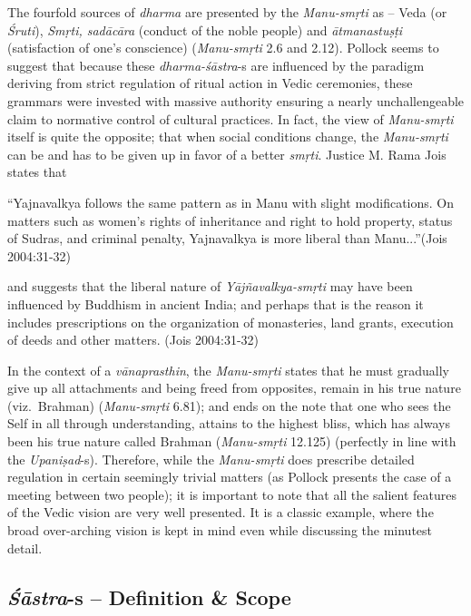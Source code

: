 The fourfold sources of {\sl dharma} are presented by the {\sl Manu-smṛti} as -- Veda (or {\sl Śruti}), {\sl Smṛti, sadācāra} (conduct of the noble people) and {\sl ātmanastuṣṭi} (satisfaction of one's conscience) ({\sl Manu-smṛti} 2.6 and 2.12). Pollock seems to suggest that because these {\sl dharma-śāstra}-s are influenced by the paradigm deriving from strict regulation of ritual action in Vedic ceremonies, these grammars were invested with massive authority ensuring a nearly unchallengeable claim to normative control of cultural practices. In fact, the view of {\sl Manu-smṛti} itself is quite the opposite; that when social conditions change, the {\sl Manu-smṛti} can be and has to be given up in favor of a better {\sl smṛti}. Justice M. Rama Jois states that
\begin{myquote}
``Yajnavalkya follows the same pattern as in Manu with slight modifications. On matters such as women's rights of inheritance and right to hold property, status of Sudras, and criminal penalty, Yajnavalkya is more liberal than Manu...''\hfill (Jois 2004:31-32)
\end{myquote}
and suggests that the liberal nature of {\sl Yājñavalkya-smṛti} may have been influenced by Buddhism in ancient India; and perhaps that is the reason it includes prescriptions on the organization of monasteries, land grants, execution of deeds and other matters. (Jois 2004:31-32)

In the context of a {\sl vānaprasthin}, the {\sl Manu-smṛti} states that he must gradually give up all attachments and being freed from opposites, remain in his true nature (viz.\ Brahman) ({\sl Manu-smṛti} 6.81); and ends on the note that one who sees the Self in all through understanding, attains to the highest bliss, which has always been his true nature called Brahman ({\sl Manu-smṛti} 12.125) (perfectly in line with the {\sl Upaniṣad}-s). Therefore, while the {\sl Manu-smṛti} does prescribe detailed regulation in certain seemingly trivial matters (as Pollock presents the case of a meeting between two people); it is important to note that all the salient features of the Vedic vision are very well presented. It is a classic example, where the broad over-arching vision is kept in mind even while discussing the minutest detail.

\subsection{{{\sl\bfseries Śāstra}\relax}-s -- Definition \& Scope}\label{art12-sec3.4}

